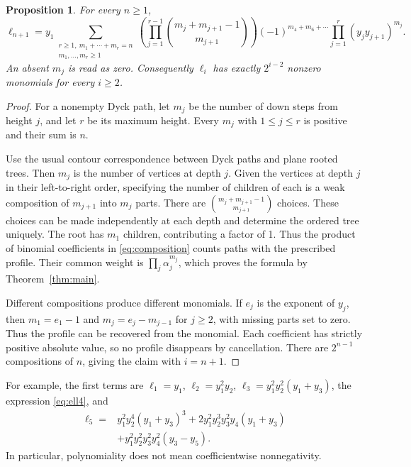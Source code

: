 \documentclass[11pt]{article}
\newtheorem{proposition}[theorem]{Proposition}
\theoremstyle{remark}
\newcommand{\LH}{\ell}
\begin{document}
\begin{proposition}\label{prop:coefficients}
For every $n\ge1$,
\begin{equation}\label{eq:composition}
 \LH_{n+1}=y_1
 \sum_{\substack{r\ge1,\ m_1+\cdots+m_r=n\\m_1,\ldots,m_r\ge1}}
 \left(\prod_{j=1}^{r-1}
       \binom{m_j+m_{j+1}-1}{m_{j+1}}\right)
 (-1)^{m_4+m_6+\cdots}
 \prod_{j=1}^{r}(y_jy_{j+1})^{m_j}.
\end{equation}
An absent $m_j$ is read as zero. Consequently $\LH_i$ has exactly
$2^{i-2}$ nonzero monomials for every $i\ge2$.
\end{proposition}
\begin{proof}
For a nonempty Dyck path, let $m_j$ be the number of down steps from
height $j$, and let $r$ be its maximum height. Every $m_j$ with
$1\le j\le r$ is positive and their sum is $n$.

Use the usual contour correspondence between Dyck paths and plane
rooted trees. Then $m_j$ is the number of vertices at depth $j$.
Given the vertices at depth $j$ in their left-to-right order, specifying
the number of children of each is a weak composition of $m_{j+1}$ into
$m_j$ parts. There are
$\binom{m_j+m_{j+1}-1}{m_{j+1}}$ choices. These choices can be made
independently at each depth and determine the ordered tree uniquely.
The root has $m_1$ children, contributing a factor of 1. Thus the product
of binomial coefficients in \eqref{eq:composition} counts paths with
the prescribed profile. Their common weight is
$\prod_j\alpha_j^{m_j}$, which proves the formula by
Theorem~\ref{thm:main}.

Different compositions produce different monomials. If $e_j$ is the
exponent of $y_j$, then $m_1=e_1-1$ and
$m_j=e_j-m_{j-1}$ for $j\ge2$, with missing parts set to zero.
Thus the profile can be recovered from the monomial. Each coefficient
has strictly positive absolute value, so no profile disappears by
cancellation. There are $2^{n-1}$ compositions of $n$, giving the claim
with $i=n+1$.
\end{proof}

For example, the first terms are $\LH_1=y_1$, $\LH_2=y_1^2y_2$,
$\LH_3=y_1^2y_2^2(y_1+y_3)$, the expression \eqref{eq:ell4}, and
\begin{align*}
 \LH_5={}&y_1^2y_2^4(y_1+y_3)^3
       +2y_1^2y_2^3y_3^2y_4(y_1+y_3)\\
       &+y_1^2y_2^2y_3^2y_4^2(y_3-y_5).
\end{align*}
In particular, polynomiality does not mean coefficientwise
nonnegativity.
\end{document}
